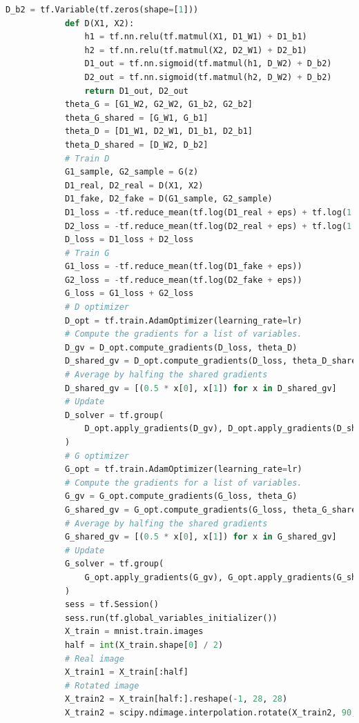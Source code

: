 \begin{lstlisting}[language = Python]
            D_b2 = tf.Variable(tf.zeros(shape=[1]))
            def D(X1, X2):
                h1 = tf.nn.relu(tf.matmul(X1, D1_W1) + D1_b1)
                h2 = tf.nn.relu(tf.matmul(X2, D2_W1) + D2_b1)
                D1_out = tf.nn.sigmoid(tf.matmul(h1, D_W2) + D_b2)
                D2_out = tf.nn.sigmoid(tf.matmul(h2, D_W2) + D_b2)
                return D1_out, D2_out
            theta_G = [G1_W2, G2_W2, G1_b2, G2_b2]
            theta_G_shared = [G_W1, G_b1]
            theta_D = [D1_W1, D2_W1, D1_b1, D2_b1]
            theta_D_shared = [D_W2, D_b2]
            # Train D
            G1_sample, G2_sample = G(z)
            D1_real, D2_real = D(X1, X2)
            D1_fake, D2_fake = D(G1_sample, G2_sample)
            D1_loss = -tf.reduce_mean(tf.log(D1_real + eps) + tf.log(1. - D1_fake + eps))
            D2_loss = -tf.reduce_mean(tf.log(D2_real + eps) + tf.log(1. - D2_fake + eps))
            D_loss = D1_loss + D2_loss
            # Train G
            G1_loss = -tf.reduce_mean(tf.log(D1_fake + eps))
            G2_loss = -tf.reduce_mean(tf.log(D2_fake + eps))
            G_loss = G1_loss + G2_loss
            # D optimizer
            D_opt = tf.train.AdamOptimizer(learning_rate=lr)
            # Compute the gradients for a list of variables.
            D_gv = D_opt.compute_gradients(D_loss, theta_D)
            D_shared_gv = D_opt.compute_gradients(D_loss, theta_D_shared)
            # Average by halfing the shared gradients
            D_shared_gv = [(0.5 * x[0], x[1]) for x in D_shared_gv]
            # Update
            D_solver = tf.group(
                D_opt.apply_gradients(D_gv), D_opt.apply_gradients(D_shared_gv)
            )
            # G optimizer
            G_opt = tf.train.AdamOptimizer(learning_rate=lr)
            # Compute the gradients for a list of variables.
            G_gv = G_opt.compute_gradients(G_loss, theta_G)
            G_shared_gv = G_opt.compute_gradients(G_loss, theta_G_shared)
            # Average by halfing the shared gradients
            G_shared_gv = [(0.5 * x[0], x[1]) for x in G_shared_gv]
            # Update
            G_solver = tf.group(
                G_opt.apply_gradients(G_gv), G_opt.apply_gradients(G_shared_gv)
            )
            sess = tf.Session()
            sess.run(tf.global_variables_initializer())
            X_train = mnist.train.images
            half = int(X_train.shape[0] / 2)
            # Real image
            X_train1 = X_train[:half]
            # Rotated image
            X_train2 = X_train[half:].reshape(-1, 28, 28)
            X_train2 = scipy.ndimage.interpolation.rotate(X_train2, 90, axes=(1, 2))

\end{lstlisting}
